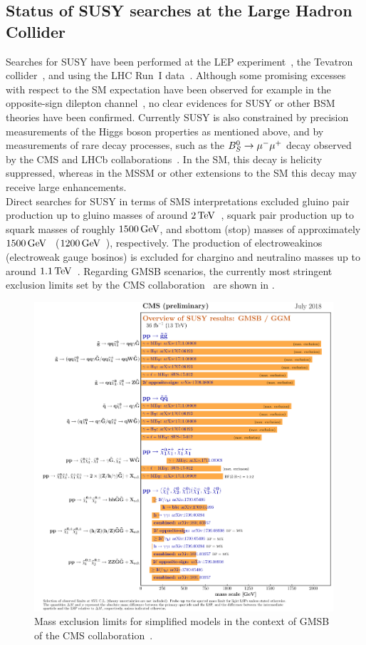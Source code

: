 \subsection{Status of SUSY searches at the Large Hadron Collider}
Searches for SUSY have been performed  at the LEP experiment~\cite{LEP}, the Tevatron collider~\cite{TEVATRON}, and using the LHC Run~I data~\cite{ChristianRunI}. Although some promising excesses with respect to the SM expectation have been observed for example in the opposite-sign dilepton channel~\cite{Edge}, no clear evidences for SUSY or other BSM theories have been confirmed. Currently SUSY is also constrained by precision measurements of the Higgs boson properties as mentioned above, and by measurements of rare decay processes, such as the $B_S^0\to{\mu^-}{\mu^+}$ decay observed by the CMS and LHCb collaborations~\cite{B0S}. In the SM, this decay is helicity suppressed, whereas in the MSSM or other extensions to the SM this decay may receive large enhancements.\\
Direct searches for SUSY in terms of SMS interpretations excluded gluino pair production up to gluino masses of around $2\,\text{Te\hspace{-.08em}V}$~\cite{GluinoCMS}, squark pair production up to squark masses of roughly $1500\,\text{Ge\hspace{-.08em}V}$, and sbottom (stop) masses of approximately $1500\,\text{Ge\hspace{-.08em}V}$~\cite{sbottom} ($1200\,\text{Ge\hspace{-.08em}V}$~\cite{stop}), respectively. The production of electroweakinos (electroweak gauge bosinos) is excluded for chargino and neutralino masses up to around $1.1\,\text{Te\hspace{-.08em}V}$~\cite{EWKinos}.
Regarding GMSB scenarios, the currently most stringent exclusion limits set by the CMS collaboration~\cite{CMS} are shown in .
\begin{figure}[tbp]
 \centering
 \includegraphics[width=0.99\textwidth]{figures/general/barplot_GMSB}
 \caption{Mass exclusion limits for simplified models in the context of GMSB of the CMS collaboration~\cite{SUSSummaryPlot}.}
 \label{fig:GMSB_summary}
\end{figure}
